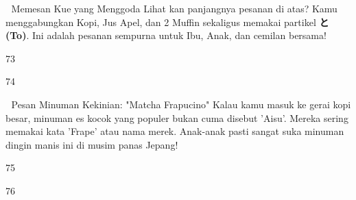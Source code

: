 \begin{lessonbox}{🧁 Memesan Kue yang Menggoda}
    Lihat kan panjangnya pesanan di atas? Kamu menggabungkan Kopi, Jus Apel, dan 2 Muffin sekaligus memakai partikel \textbf{と (To)}. Ini adalah pesanan sempurna untuk Ibu, Anak, dan cemilan bersama!
\end{lessonbox}

\begin{convobox}{73}
    \noindent

    \vspace{1.5em}
\end{convobox}

\begin{convobox}{74}
    \noindent
       
     

    \vspace{1.5em}
\end{convobox}

\begin{lessonbox}{🧋 Pesan Minuman Kekinian: "Matcha Frapucino"}
    Kalau kamu masuk ke gerai kopi besar, minuman es kocok yang populer bukan cuma disebut 'Aisu'. Mereka sering memakai kata 'Frape' atau nama merek. Anak-anak pasti sangat suka minuman dingin manis ini di musim panas Jepang!
\end{lessonbox}

\begin{convobox}{75}
    \noindent
     

    \vspace{1.5em}
\end{convobox}

\begin{convobox}{76}
    \noindent

    \vspace{1.5em}
\end{convobox}

